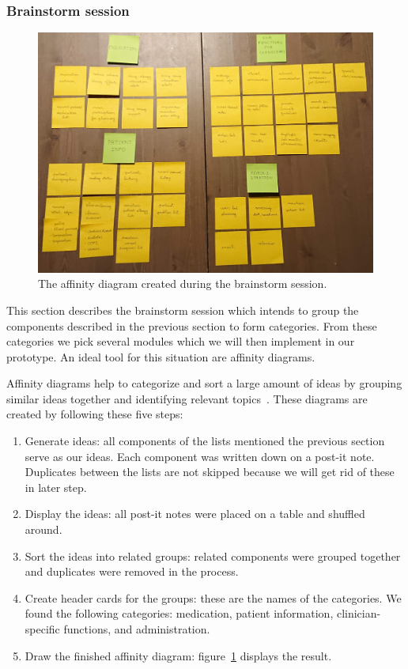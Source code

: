         \subsubsection{Brainstorm session}

        \begin{figure}[!t]
            \centering
            \includegraphics[width=1\textwidth]{chapters/3_design/affinity}
            \caption{The affinity diagram created during the brainstorm session.}\label{fig:affinity}
        \end{figure}
        This section describes the brainstorm session which intends to group the components described in the previous section to form categories. From these categories we pick several modules which we will then implement in our prototype. An ideal tool for this situation are affinity diagrams.

        Affinity diagrams help to categorize and sort a large amount of ideas by grouping similar ideas together and identifying relevant topics~\cite{Affinity}. These diagrams are created by following these five steps:
        \begin{enumerate}
            \item Generate ideas: all components of the lists mentioned the previous section serve as our ideas. Each component was written down on a post-it note. Duplicates between the lists are not skipped because we will get rid of these in later step.
            \item Display the ideas: all post-it notes were placed on a table and shuffled around.
            \item Sort the ideas into related groups: related components were grouped together and duplicates were removed in the process. 
            \item Create header cards for the groups: these are the names of the categories. We found the following categories: medication, patient information, clinician-specific functions, and administration.
            \item Draw the finished affinity diagram: figure~\ref{fig:affinity} displays the result.
        \end{enumerate}

